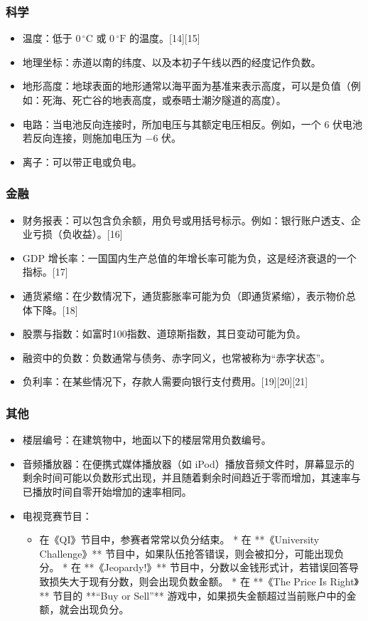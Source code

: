 \subsubsection{科学}
\begin{itemize}
\item 温度：低于 $0 \,^\circ\text{C}$ 或 $0 \,^\circ\text{F}$ 的温度。[14][15]
\item 地理坐标：赤道以南的纬度、以及本初子午线以西的经度记作负数。
\item 地形高度：地球表面的地形通常以海平面为基准来表示高度，可以是负值（例如：死海、死亡谷的地表高度，或泰晤士潮汐隧道的高度）。
\item 电路：当电池反向连接时，所加电压与其额定电压相反。例如，一个 6 伏电池若反向连接，则施加电压为 $-6$ 伏。
\item 离子：可以带正电或负电。
\end{itemize}
\subsubsection{金融}
\begin{itemize}
\item 财务报表：可以包含负余额，用负号或用括号标示。例如：银行账户透支、企业亏损（负收益）。[16]
\item GDP 增长率：一国国内生产总值的年增长率可能为负，这是经济衰退的一个指标。[17]
\item 通货紧缩：在少数情况下，通货膨胀率可能为负（即通货紧缩），表示物价总体下降。[18]
\item 股票与指数：如富时100指数、道琼斯指数，其日变动可能为负。
\item 融资中的负数：负数通常与债务、赤字同义，也常被称为“赤字状态”。
\item 负利率：在某些情况下，存款人需要向银行支付费用。[19][20][21]
\end{itemize}
\subsubsection{其他}
\begin{itemize}
\item 楼层编号：在建筑物中，地面以下的楼层常用负数编号。
\item 音频播放器：在便携式媒体播放器（如 iPod）播放音频文件时，屏幕显示的剩余时间可能以负数形式出现，并且随着剩余时间趋近于零而增加，其速率与已播放时间自零开始增加的速率相同。
\item 电视竞赛节目：
\begin{itemize}
\item 在《QI》节目中，参赛者常常以负分结束。
  * 在 **《University Challenge》** 节目中，如果队伍抢答错误，则会被扣分，可能出现负分。
  * 在 **《Jeopardy!》** 节目中，分数以金钱形式计，若错误回答导致损失大于现有分数，则会出现负数金额。
  * 在 **《The Price Is Right》** 节目的 **“Buy or Sell”** 游戏中，如果损失金额超过当前账户中的金额，就会出现负分。
 \end{itemize}
\end{itemize}

